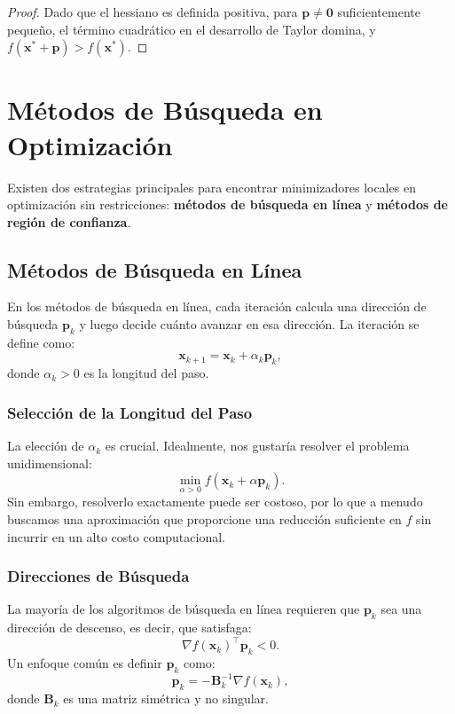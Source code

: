 \begin{proof}
Dado que el hessiano es definida positiva, para $\mathbf{p} \neq \mathbf{0}$ suficientemente pequeño, el término cuadrático en el desarrollo de Taylor domina, y $f(\mathbf{x}^* + \mathbf{p}) > f(\mathbf{x}^*)$.
\end{proof}

\section{Métodos de Búsqueda en Optimización}

Existen dos estrategias principales para encontrar minimizadores locales en optimización sin restricciones: \textbf{métodos de búsqueda en línea} y \textbf{métodos de región de confianza}.

\subsection{Métodos de Búsqueda en Línea}

En los métodos de búsqueda en línea, cada iteración calcula una dirección de búsqueda $\mathbf{p}_k$ y luego decide cuánto avanzar en esa dirección. La iteración se define como:
\begin{equation}
\mathbf{x}_{k+1} = \mathbf{x}_k + \alpha_k \mathbf{p}_k,
\end{equation}
donde $\alpha_k > 0$ es la longitud del paso.

\subsubsection{Selección de la Longitud del Paso}

La elección de $\alpha_k$ es crucial. Idealmente, nos gustaría resolver el problema unidimensional:
\begin{equation}
\min_{\alpha > 0} f(\mathbf{x}_k + \alpha \mathbf{p}_k).
\end{equation}
Sin embargo, resolverlo exactamente puede ser costoso, por lo que a menudo buscamos una aproximación que proporcione una reducción suficiente en $f$ sin incurrir en un alto costo computacional.

\subsubsection{Direcciones de Búsqueda}

La mayoría de los algoritmos de búsqueda en línea requieren que $\mathbf{p}_k$ sea una dirección de descenso, es decir, que satisfaga:
\begin{equation}
\nabla f(\mathbf{x}_k)^\top \mathbf{p}_k < 0.
\end{equation}
Un enfoque común es definir $\mathbf{p}_k$ como:
\begin{equation}
\label{eq:pk_general}
\mathbf{p}_k = -\mathbf{B}_k^{-1} \nabla f(\mathbf{x}_k),
\end{equation}
donde $\mathbf{B}_k$ es una matriz simétrica y no singular.

